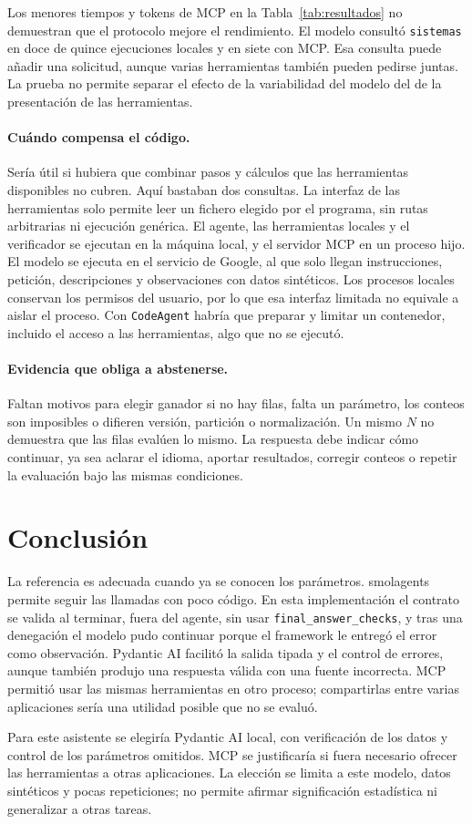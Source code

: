 Los menores tiempos y tokens de MCP en la Tabla~\ref{tab:resultados} no demuestran que el protocolo mejore el rendimiento. El modelo consultó \texttt{sistemas} en doce de quince ejecuciones locales y en siete con MCP. Esa consulta puede añadir una solicitud, aunque varias herramientas también pueden pedirse juntas. La prueba no permite separar el efecto de la variabilidad del modelo del de la presentación de las herramientas.

\paragraph{Cuándo compensa el código.} Sería útil si hubiera que combinar pasos y cálculos que las herramientas disponibles no cubren. Aquí bastaban dos consultas. La interfaz de las herramientas solo permite leer un fichero elegido por el programa, sin rutas arbitrarias ni ejecución genérica. El agente, las herramientas locales y el verificador se ejecutan en la máquina local, y el servidor MCP en un proceso hijo. El modelo se ejecuta en el servicio de Google, al que solo llegan instrucciones, petición, descripciones y observaciones con datos sintéticos. Los procesos locales conservan los permisos del usuario, por lo que esa interfaz limitada no equivale a aislar el proceso. Con \texttt{CodeAgent} habría que preparar y limitar un contenedor, incluido el acceso a las herramientas, algo que no se ejecutó.

\paragraph{Evidencia que obliga a abstenerse.} Faltan motivos para elegir ganador si no hay filas, falta un parámetro, los conteos son imposibles o difieren versión, partición o normalización. Un mismo $N$ no demuestra que las filas evalúen lo mismo. La respuesta debe indicar cómo continuar, ya sea aclarar el idioma, aportar resultados, corregir conteos o repetir la evaluación bajo las mismas condiciones.

\section{Conclusión}

La referencia es adecuada cuando ya se conocen los parámetros. smolagents permite seguir las llamadas con poco código. En esta implementación el contrato se valida al terminar, fuera del agente, sin usar \texttt{final\_answer\_checks}, y tras una denegación el modelo pudo continuar porque el framework le entregó el error como observación. Pydantic AI facilitó la salida tipada y el control de errores, aunque también produjo una respuesta válida con una fuente incorrecta. MCP permitió usar las mismas herramientas en otro proceso; compartirlas entre varias aplicaciones sería una utilidad posible que no se evaluó.

Para este asistente se elegiría Pydantic AI local, con verificación de los datos y control de los parámetros omitidos. MCP se justificaría si fuera necesario ofrecer las herramientas a otras aplicaciones. La elección se limita a este modelo, datos sintéticos y pocas repeticiones; no permite afirmar significación estadística ni generalizar a otras tareas.
